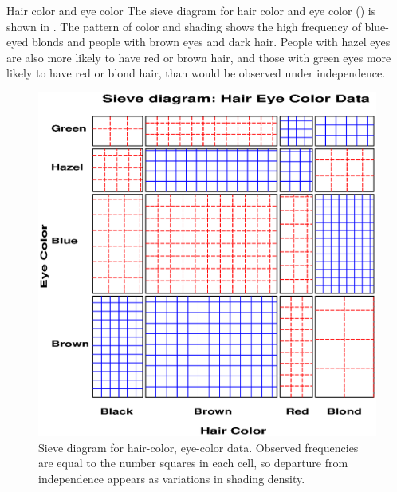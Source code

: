 \begin{Example}[haireye2]{Hair color and eye color}
The sieve diagram for hair color and eye color ()
is shown in
.
The pattern of color and shading shows the high frequency of
blue-eyed blonds and people with brown eyes and dark hair.
People with hazel eyes are also more likely to have red or brown hair,
and those with green eyes more likely to have red or blond hair,
than would be observed under independence.

\begin{figure}[htb]
  \centering
  \includegraphics[scale=.5]{ch3/fig/sieve1}
  \caption[Sieve diagram for hair-color, eye-color data]{Sieve diagram for hair-color, eye-color data.  Observed frequencies are equal to the number
  squares in each cell, so departure from independence appears as variations
  in shading density.}\label{fig:sieve1}
\end{figure}
\end{Example}

